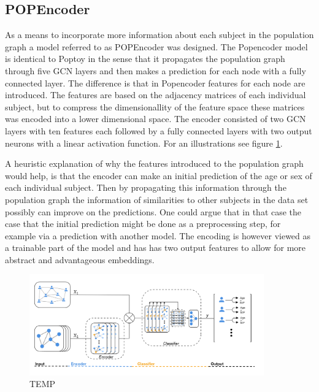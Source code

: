 \subsection{POPEncoder}
As a means to incorporate more information about each subject in the population graph a model referred to as POPEncoder was designed. The Popencoder model is identical to Poptoy in the sense that it propagates the population graph through five GCN layers and then makes a prediction for each node with a fully connected layer. The difference is that in Popencoder features for each node are introduced. The features are based on the adjacency matrices of each individual subject, but to compress the dimensionallity of the feature space these matrices was encoded into a lower dimensional space. The encoder consisted of two GCN layers with ten features each followed by a fully connected layers with two output neurons with a linear activation function. For an illustrations see figure \ref{fig:popencoder}.

A heuristic explanation of why the features introduced to the population graph would help, is that the encoder can make an initial prediction of the age or sex of each individual subject. Then by propagating this information through the population graph the information of similarities to other subjects in the data set possibly can improve on the predictions. One could argue that in that case the case that the initial prediction might be done as a preprocessing step, for example via a prediction with another model. The encoding is however viewed as a trainable part of the model and has has two output features to allow for more abstract and advantageous embeddings. 



\begin{figure}[H]
    \centering
    \includegraphics[width=0.9\textwidth]{chapters/images_methods/popencoder_v2.png}
    \caption{TEMP}
    \label{fig:popencoder}
\end{figure}

